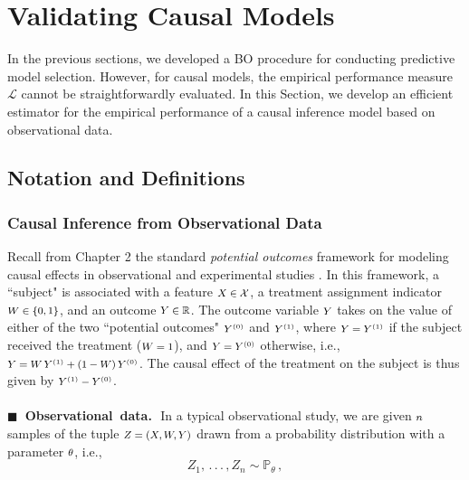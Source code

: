 \documentclass [PhD] {uclathes}
\begin{document}
\section{Validating Causal Models}
In the previous sections, we developed a BO procedure for conducting predictive model selection. However, for causal models, the empirical performance measure $\mathcal{L}$ cannot be straightforwardly evaluated. In this Section, we develop an efficient estimator for the empirical performance of a causal inference model based on observational data.

\subsection{Notation and Definitions}
\label{ch4sec44}
\subsubsection{Causal Inference from Observational Data}
\label{ch4sec441}
Recall from Chapter 2 the standard {\it potential outcomes} framework for modeling causal effects in observational and experimental studies \cite{rubin1974estimating,rubin2005causal}. In this framework, a ``subject" is associated with a feature $\mbox{\footnotesize $X \in \mathcal{X}$}$, a treatment assignment indicator $\mbox{\footnotesize $W \in \{0,1\}$}$, and an outcome $\mbox{\footnotesize $Y \in \mathbb{R}$}$. The outcome variable $\mbox{\footnotesize $Y$}$ takes on the value of either of the two ``potential outcomes" $\mbox{\footnotesize $Y^{\mbox{\tiny $(0)$}}$}$ and $\mbox{\footnotesize $Y^{\mbox{\tiny $(1)$}}$}$, where $\mbox{\footnotesize $Y=Y^{\mbox{\tiny $(1)$}}$}$ if the subject received the treatment ($\mbox{\footnotesize $W=1$}$), and $\mbox{\footnotesize $Y=Y^{\mbox{\tiny $(0)$}}$}$ otherwise, i.e., $\mbox{\footnotesize $Y = W\,Y^{\mbox{\tiny $(1)$}} + (1-W)\,Y^{\mbox{\tiny $(0)$}}$}$. The causal effect of the treatment on the subject is thus given by $\mbox{\footnotesize $Y^{\mbox{\tiny $(1)$}}-Y^{\mbox{\tiny $(0)$}}$}$. \\
\\ 
{\bf \mbox{\tiny $\blacksquare$}~Observational~data.}\,~In a typical observational study, we are given $\mbox{\footnotesize $n$}$ samples of the tuple $\mbox{\footnotesize $Z = (X, W, Y)$}$ drawn from a probability distribution with a parameter $\mbox{\footnotesize $\theta$}$, i.e., 
\begin{equation}
Z_1,\,.\,.\,.\,,Z_n \sim \mathbb{P}_{\theta}\,, 
\label{ch4eq9}
\end{equation}
\end{document}
